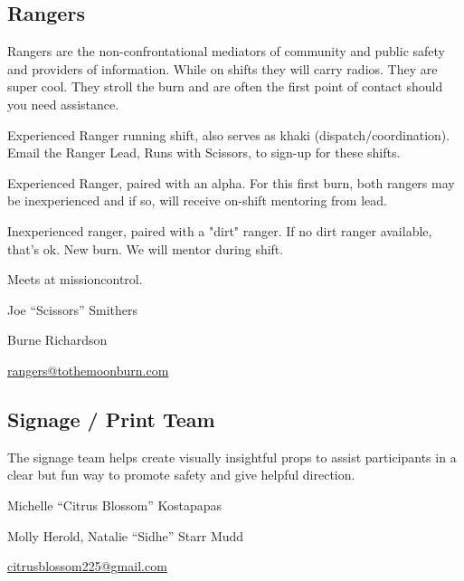 \subsection*{Rangers}
Rangers are the non-confrontational mediators of community and public safety and providers of information. While on shifts they will carry radios. They are super cool. They stroll the burn and are often the first point of contact should you need assistance.

\begin{addmargin}[.3cm]{0cm}
\begin{description}[noitemsep]
	\item[Khaki:] Experienced Ranger running shift, also serves as khaki (dispatch/coordination). Email the Ranger Lead, Runs with Scissors, to sign-up for these shifts.
	\item[Dirt Patrol:] Experienced Ranger, paired with an alpha. For this first burn, both rangers may be inexperienced and if so, will receive on-shift mentoring from lead.
	\item[Alpha:] Inexperienced ranger, paired with a "dirt" ranger. If no dirt ranger available, that's ok. New burn. We will mentor during shift.
\end{description}
\end{addmargin}

Meets at \gls{missioncontrol}.

\begin{description}[leftmargin=6em,noitemsep,style=nextline]
   \item[Lead:] Joe ``Scissors'' Smithers
   \item[Co-leads:] Burne Richardson
   \item[Contact:] \url{rangers@tothemoonburn.com}
\end{description}


\subsection*{Signage / Print Team}
The signage team helps create visually insightful props to assist participants in a clear but fun way to promote safety and give helpful direction.

\begin{description}[leftmargin=6em,noitemsep,style=nextline]
   \item[Lead:] Michelle ``Citrus Blossom'' Kostapapas
   \item[Co-leads:] Molly Herold, Natalie ``Sidhe'' Starr Mudd
   \item[Contact:] \url{citrusblossom225@gmail.com}
\end{description}


